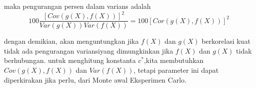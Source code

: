 \documentclass[a4paper,12pt]{article}
\theoremstyle{definition}
\begin{document}
maka pengurangan persen dalam varians adalah 
\begin{equation*}
    100\frac{\left [ Cov\left ( g\left ( X \right ),f\left ( X \right ) \right ) \right ]^{2}}{Var\left ( g\left ( X \right ) \right )Var\left ( f\left ( X \right ) \right )}=100\left [ Cor\left ( g\left ( X \right ), f\left ( X \right )\right ) \right ]^{2}
\end{equation*}

dengan demikian, akan menguntungkan jika $f\left (  X\right )$ dan $g\left (X  \right )$ berkorelasi kuat tidak ada pengurangan variansiyang dimungkinkan jika  $f\left (  X\right )$ dan $g\left (X  \right )$ tidak berhubungan. untuk menghitung konstanta $c^{*}$,kita membutuhkan $Cov\left ( g\left ( X \right ),f\left ( X \right ) \right )$ dan $Var\left ( f\left ( X \right ) \right )$, tetapi parameter ini dapat diperkirakan jika perlu, dari Monte awal Eksperimen Carlo.
\end{document}
